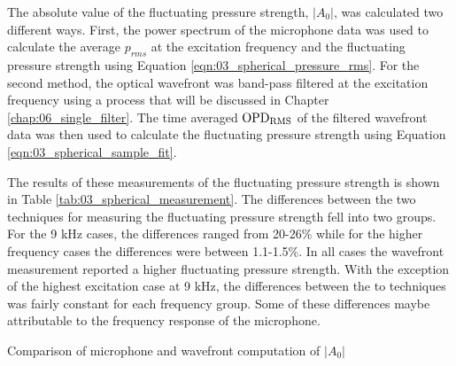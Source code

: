 The absolute value of the fluctuating pressure strength, $|A_0|$, was calculated two different ways.
First, the power spectrum of the microphone data was used to calculate the average $p_{rms}$ at the excitation frequency and the fluctuating pressure strength using Equation \ref{eqn:03_spherical_pressure_rms}.
For the second method, the optical wavefront was band-pass filtered at the excitation frequency using a process that will be discussed in Chapter \ref{chap:06_single_filter}.
The time averaged $\operatorname{OPD_{RMS}}$ of the filtered wavefront data was then used to calculate the fluctuating pressure strength using Equation \ref{eqn:03_spherical_sample_fit}.

The results of these measurements of the fluctuating pressure strength is shown in Table \ref{tab:03_spherical_measurement}.
The differences between the two techniques for measuring the fluctuating pressure strength fell into two groups.
For the 9 kHz cases, the differences ranged from 20-26\% while for the higher frequency cases the differences were between 1.1-1.5\%.
In all cases the wavefront measurement reported a higher fluctuating pressure strength.
With the exception of the highest excitation case at 9 kHz, the differences between the to techniques was fairly constant for each frequency group.
Some of these differences maybe attributable to the frequency response of the microphone.
\begin{table}
  \centering
  \caption{Comparison of microphone and wavefront computation of $|A_0|$}
  
  \label{tab:03_spherical_measurement}
\end{table}

